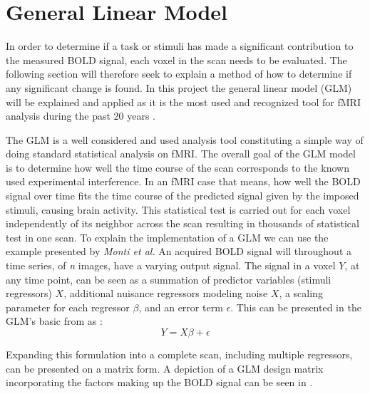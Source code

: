 \section{General Linear Model} \label{back:sec:glm}

In order to determine if a task or stimuli has made a significant contribution to the measured BOLD signal, each voxel in the scan needs to be evaluated. The following section will therefore seek to explain a method of how to determine if any significant change is found. In this project the general linear model (GLM) will be explained and applied as it is the most used and recognized tool for fMRI analysis during the past 20 years \cite{Poline2012}. 

The GLM is a well considered and used analysis tool constituting a simple way of doing standard statistical analysis on fMRI. The overall goal of the GLM model is to determine how well the time course of the scan corresponds to the known used experimental interference.  In an fMRI case that means, how well the BOLD signal over time fits the time course of the predicted signal given by the imposed stimuli, causing brain activity. This statistical test is carried out for each voxel independently of its neighbor across the scan resulting in thousands of statistical test in one scan. \cite{Moayedi2018,Monti2011} To explain the implementation of a GLM we can use the example presented by \textit{Monti et al.} An acquired BOLD signal will throughout a time series, of \textit{n} images, have a varying output signal. The signal in a voxel $Y$, at any time point, can be seen as a summation of predictor variables (stimuli regressors) $X$,  additional nuisance regressors modeling noise $X$, a scaling parameter for each regressor $\beta$, and an error term $\epsilon$. This can be presented in the GLM's basic from as \cite{Monti2011}: 
\begin{equation}
Y=X\beta+\epsilon
\end{equation}

Expanding this formulation into a complete scan, including multiple regressors, can be presented on a matrix form. A depiction of a GLM design matrix incorporating the factors making up the BOLD signal can be seen in . 

